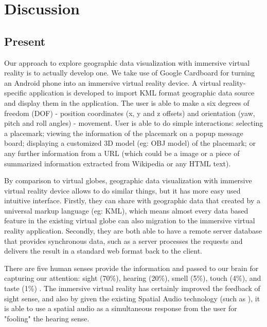 \label{chapter-discussion}
\chapter{Discussion}

\section{Present}

Our approach to explore geographic data visualization with immersive virtual reality is to actually develop one. We take use of Google Cardboard for turning an Android phone into an immersive virtual reality device. A virtual reality-specific application is developed to import KML format geographic data source and display them in the application. The user is able to make a six degrees of freedom (DOF) - position coordinates (x, y and z offsets) and orientation (yaw, pitch and roll angles) - movement. User is able to do simple interactions: selecting a placemark; viewing the information of the placemark on a popup message board; displaying a customized 3D model (eg: OBJ model) of the placemark; or any further information from a URL (which could be a image or a piece of summarized information extracted from Wikipedia or any HTML text).

By comparison to virtual globes, geographic data visualization with immersive virtual reality device allows to do similar things, but it has more easy used intuitive interface. Firstly, they can share with geographic data that created by a universal markup language (eg: KML), which means almost every data based feature in the existing virtual globe can also migration to the immersive virtual reality application. Secondly, they are both able to have a remote server database that provides synchronous data, such as a server processes the requests and delivers the result in a standard web format back to the client. 

There are five human senses provide the information and passed to our brain for capturing our attention: sight (70\%), hearing (20\%), smell (5\%), touch (4\%), and taste (1\%) \cite{mazuryk.vr.1996}. The immersive virtual reality has certainly improved the feedback of sight sense, and also by given the existing Spatial Audio technology (such as \cite{google.spatial-audio.2016}), it is able to use a spatial audio as a simultaneous response from the user for "fooling" the hearing sense.

